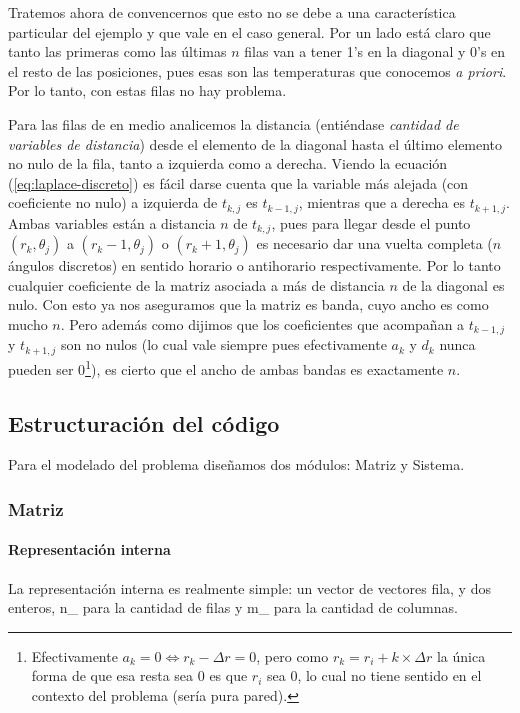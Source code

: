 Tratemos ahora de convencernos que esto no se debe a una característica particular del ejemplo y que vale en el caso general.
Por un lado está claro que tanto las primeras como las últimas $n$ filas van a tener 1's en la diagonal y 0's en el resto de las posiciones, pues esas son las temperaturas que conocemos \textit{a priori}. Por lo tanto, con estas filas no hay problema.

Para las filas de en medio analicemos la distancia (entiéndase \textit{cantidad de variables de distancia}) desde el elemento de la diagonal hasta el último elemento no nulo de la fila, tanto a izquierda como  a derecha. Viendo la ecuación (\ref{eq:laplace-discreto}) es fácil darse cuenta que la variable más alejada (con coeficiente no nulo) a izquierda de $t_{k,j}$ es $t_{k-1, j}$, mientras que a derecha es $t_{k+1, j}$. Ambas variables están a distancia $n$ de $t_{k,j}$, pues para llegar desde el punto $(r_k, \theta_j)$ a $(r_k-1, \theta_j)$ o $(r_k+1, \theta_j)$ es necesario dar una vuelta completa ($n$ ángulos discretos) en sentido horario o antihorario respectivamente. Por lo tanto cualquier coeficiente de la matriz asociada a más de distancia $n$ de la diagonal es nulo. Con esto ya nos aseguramos que la matriz es banda, cuyo ancho es como mucho $n$. Pero además como dijimos que los coeficientes que acompañan a $t_{k-1, j}$ y $t_{k+1, j}$ son no nulos (lo cual vale siempre pues efectivamente $a_k$ y $d_k$ nunca pueden ser 0\footnote{Efectivamente $a_k = 0 \Leftrightarrow r_k - \Delta r = 0$, pero como $r_k = r_i + k\times \Delta r$ la única forma de que esa resta sea 0 es que $r_i$ sea 0, lo cual no tiene sentido en el contexto del problema (sería pura pared).}), es cierto que el ancho de ambas bandas es exactamente $n$. 


\subsection{Estructuración del código}
Para el modelado del problema diseñamos dos módulos: Matriz y Sistema. 

\subsubsection{Matriz}
\paragraph{Representación interna}
La representación interna es realmente simple: un vector de vectores fila, y dos enteros, n\_ para la cantidad de filas y m\_ para la cantidad de columnas.

